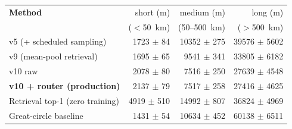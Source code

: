 \begin{tabular}{lrrr}
\toprule
\textbf{Method} & \ade{} short (m) & \ade{} medium (m) & \ade{} long (m) \\
                & ($<$50~km)       & (50--500~km)      & ($>$500~km) \\
\midrule
v5 (+ scheduled sampling) & 1723 $\pm$ 84 & 10352 $\pm$ 275 & 39576 $\pm$ 5602 \\
v9 (mean-pool retrieval) & 1695 $\pm$ 65 & 9541 $\pm$ 341 & 33805 $\pm$ 6182 \\
v10 raw & 2078 $\pm$ 80 & 7516 $\pm$ 250 & 27639 $\pm$ 4548 \\
\textbf{v10 + router (production)} & 2137 $\pm$ 79 & 7517 $\pm$ 258 & 27416 $\pm$ 4625 \\
Retrieval top-1 (zero training) & 4919 $\pm$ 510 & 14992 $\pm$ 807 & 36824 $\pm$ 4969 \\
Great-circle baseline & 1431 $\pm$ 54 & 10634 $\pm$ 452 & 60138 $\pm$ 6511 \\
\bottomrule
\end{tabular}
